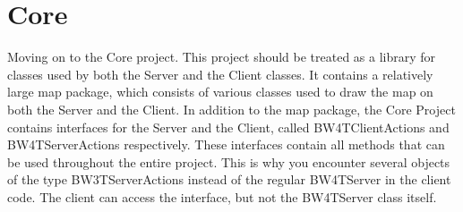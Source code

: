 \section*{Core}
Moving on to the Core project. This project should be treated as a library for classes used by both the Server and the Client classes. It contains a relatively large map package, which consists of various classes used to draw the map on both the Server and the Client. In addition to the map package, the Core Project contains interfaces for the Server and the Client, called BW4TClientActions and BW4TServerActions respectively. These interfaces contain all methods that can be used throughout the entire project. This is why you encounter several objects of the type BW3TServerActions instead of the regular BW4TServer in the client code. The client can access the interface, but not the BW4TServer class itself. 
